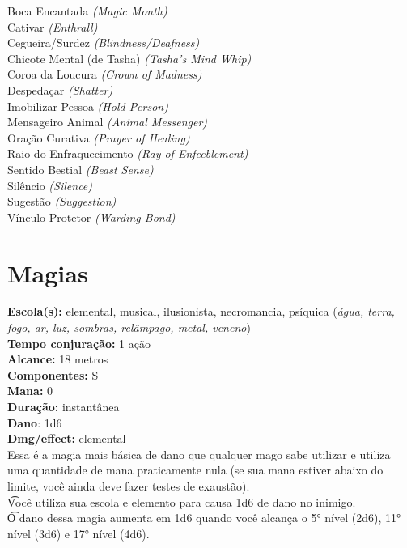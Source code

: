 \documentclass{RPG_Adventure}[2021/10/20]
\begin{document}
{\normalsize Boca Encantada \textit{(Magic Month)}\\ }
{\normalsize Cativar \textit{(Enthrall)}\\ }
{\normalsize Cegueira/Surdez \textit{(Blindness/Deafness)}\\ }
{\normalsize Chicote Mental (de Tasha) \textit{(Tasha's Mind Whip)}\\ }
{\normalsize Coroa da Loucura \textit{(Crown of Madness)}\\ }
{\normalsize Despedaçar \textit{(Shatter)}\\ }
{\normalsize Imobilizar Pessoa \textit{(Hold Person)}\\ }
{\normalsize Mensageiro Animal \textit{(Animal Messenger)}\\ }
{\normalsize Oração Curativa \textit{(Prayer of Healing)}\\ }
{\normalsize Raio do Enfraquecimento \textit{(Ray of Enfeeblement)}\\ }
{\normalsize Sentido Bestial \textit{(Beast Sense)}\\ }
{\normalsize Silêncio \textit{(Silence)}\\ }
{\normalsize Sugestão \textit{(Suggestion)}\\ }
{\normalsize Vínculo Protetor \textit{(Warding Bond)}\\ }
\jump\chapter{Magias}\n\n{}
{\small \t \textbf{Escola(s):} elemental, musical, ilusionista, necromancia, psíquica (\textit{água, terra, fogo, ar, luz, sombras, relâmpago, metal, veneno})\\\t \textbf{Tempo conjuração:} 1 ação\\\t \textbf{Alcance:} 18 metros\\\t \textbf{Componentes:} S\\\t \textbf{Mana:} 0\\\t \textbf{Duração:} instantânea\\\t \textbf{Dano}: 1d6\\\t \textbf{Dmg/effect:} elemental\\}
{\normalsize Essa é a magia mais básica de dano que qualquer mago sabe utilizar e utiliza uma quantidade de mana praticamente nula (se sua mana estiver abaixo do limite, você ainda deve fazer testes de exaustão).\\\t Você utiliza sua escola e elemento para causa 1d6 de dano no inimigo.\\\t O dano dessa magia aumenta em 1d6 quando você alcança o 5° nível (2d6), 11° nível (3d6) e 17° nível (4d6).\\}
\end{document}
